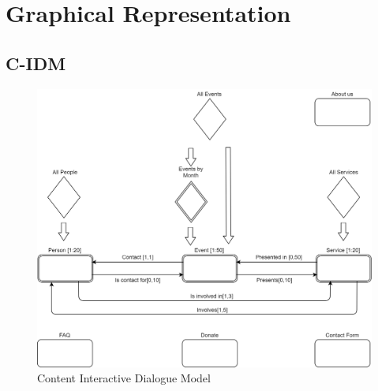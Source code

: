 \documentclass[11pt, a4paperm, hidelinks]{article}
\begin{document}
	\section{Graphical Representation}

	\subsection{C-IDM}
	\begin{figure}[h!]
		\centering
		\begin{minipage}[b]{1\textwidth}
    			\includegraphics[width=\textwidth]{./assets/C-IDM.png}
			\caption{Content Interactive Dialogue Model}
		\end{minipage}
	\end{figure}
	\FloatBarrier

	\clearpage
\end{document}
